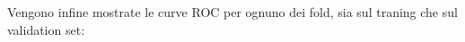 Vengono infine mostrate le curve ROC per ognuno dei fold, sia sul traning che 
sul validation set:

%	
%	
%	
%	
%	
%	
%	
%	
%	
%	

